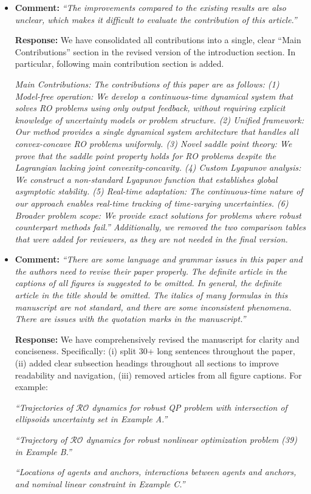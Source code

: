 \documentclass[journal,twoside,web]{ieeecolor}
\begin{document}
\begin{itemize}

\item \textbf{Comment:} \textit{``The improvements compared to the existing results are also unclear, which makes it difficult to evaluate the contribution of this article.''}

\textbf{Response:} We have consolidated all contributions into a single, clear ``Main Contributions'' section in the revised version of the introduction section. In particular, following main contribution section is added.


{\color{revisionblue}\textit{Main Contributions: The contributions of this paper are as follows: (1) \textit{Model-free operation:} We develop a continuous-time dynamical system that solves RO problems using only output feedback, without requiring explicit knowledge of uncertainty models or problem structure. (2) \textit{Unified framework:} Our method provides a single dynamical system architecture that handles all convex-concave RO problems uniformly. (3) \textit{Novel saddle point theory:} We prove that the saddle point property holds for RO problems despite the Lagrangian lacking joint convexity-concavity. (4) \textit{Custom Lyapunov analysis:} We construct a non-standard Lyapunov function that establishes global asymptotic stability. (5) \textit{Real-time adaptation:} The continuous-time nature of our approach enables real-time tracking of time-varying uncertainties. (6) \textit{Broader problem scope:} We provide exact solutions for problems where robust counterpart methods fail.'' Additionally, we removed the two comparison tables that were added for reviewers, as they are not needed in the final version.}}

\item \textbf{Comment:} \textit{``There are some language and grammar issues in this paper and the authors need to revise their paper properly. The definite article in the captions of all figures is suggested to be omitted. In general, the definite article in the title should be omitted. The italics of many formulas in this manuscript are not standard, and there are some inconsistent phenomena. There are issues with the quotation marks in the manuscript.''}

\textbf{Response:} We have comprehensively revised the manuscript for clarity and conciseness. Specifically: (i) split 30+ long sentences throughout the paper, (ii) added clear subsection headings throughout all sections to improve readability and navigation, (iii) removed articles from all figure captions. For example:

{\color{revisionblue}\textit{``Trajectories of $\mathcal{RO}$ dynamics for robust QP problem with intersection of ellipsoids uncertainty set in Example A.''}}

{\color{revisionblue}\textit{``Trajectory of $\mathcal{RO}$ dynamics for robust nonlinear optimization problem (39) in Example B.''}}

{\color{revisionblue}\textit{``Locations of agents and anchors, interactions between agents and anchors, and nominal linear constraint in Example C.''}}

\end{itemize}
\end{document}
